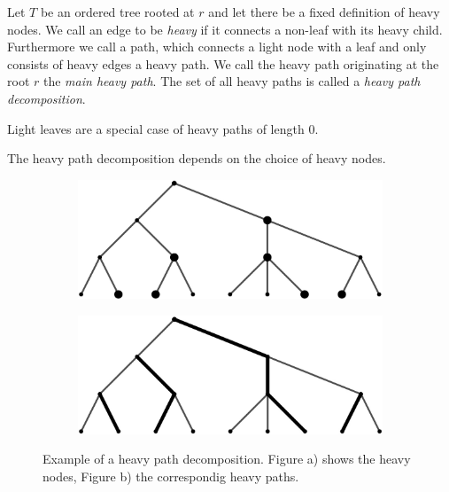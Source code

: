 \begin{defin}
Let $T$ be an ordered tree rooted at $r$ and let there be a fixed definition of heavy nodes. We call an edge to be \textit{heavy} if it connects a non-leaf with its heavy child. Furthermore we call a path, which connects a light node with a leaf and only consists of heavy edges a heavy path. We call the heavy path originating at the root $r$ the \textit{main heavy path}. The set of all heavy paths is called a \textit{heavy path decomposition}. 
\end{defin}
\begin{rem}
Light leaves are a special case of heavy paths of length 0.
\end{rem}
\begin{rem}
The heavy path decomposition depends on the choice of heavy nodes.
\end{rem}
\begin{figure}[!ht]
	\centering
	\begin{subfigure}[b]{0.45\textwidth}
	\caption{}
	\includegraphics[width=\textwidth]{figures/heavy_nodes.jpg}
    \end{subfigure}
    \begin{subfigure}[b]{0.45\textwidth}
	\caption{}
	\includegraphics[width=\textwidth]{figures/heavy_path_decomposition.jpg}
    \end{subfigure}
	\caption{Example of a heavy path decomposition. Figure a) shows the heavy nodes, Figure b) the correspondig heavy paths.}\label{fig:heavypath}
\end{figure}
